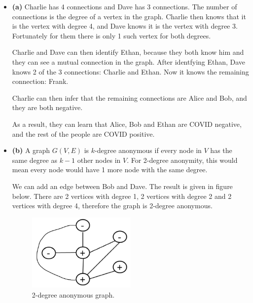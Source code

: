 \documentclass[12pt,reqno]{amsart}
\begin{document}
\begin{itemize}[label=]
	\item \textbf{(a)} Charlie has 4 connections and Dave has 3 connections. The number of connections is the degree of a vertex in the graph. Charlie then knows that it is the vertex with degree 4, and Dave knows it is the vertex with degree 3. Fortunately for them there is only 1 such vertex for both degrees.
	
	Charlie and Dave can then identify Ethan, because they both know him and they can see a mutual connection in the graph. After identfying Ethan, Dave knows 2 of the 3 connections: Charlie and Ethan. Now it knows the remaining connection: Frank.
	
	Charlie can then infer that the remaining connections are Alice and Bob, and they are both negative.
	
	As a result, they can learn that Alice, Bob and Ethan are COVID negative, and the rest of the people are COVID positive.
	\item \textbf{(b)} A graph $G(V,E)$ is $k$-degree anonymous if every node in $V$ has the same degree as $k-1$ other nodes in $V$. For 2-degree anonymity, this would mean every node would have 1 more node with the same degree.
	
	We can add an edge between Bob and Dave. The result is given in figure below. There are 2 vertices with degree 1, 2 vertices with degree 2 and 2 vertices with degree 4, therefore the graph is 2-degree anonymous.
	\begin{figure}[hb]
		\caption{2-degree anonymous graph.}
		\includegraphics[width=0.5\textwidth]{q6.png}
	\end{figure}
	
	
\end{itemize}
\end{document}

